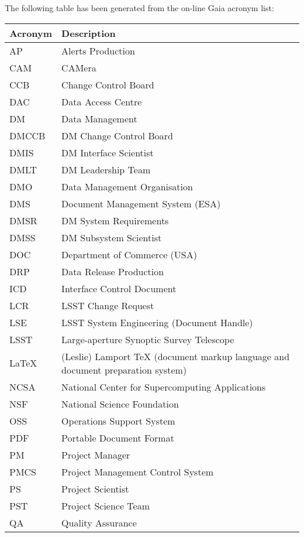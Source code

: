 The following table has been generated from the on-line Gaia acronym list:
\newline\newline%
\addtocounter{table}{-1}
\begin{longtable}{|l|p{}|}\hline 
\textbf{Acronym} & \textbf{Description}  \\\hline
AP&Alerts Production \\\hline
CAM&CAMera \\\hline
CCB&Change Control Board \\\hline
DAC&Data Access Centre \\\hline
DM&Data Management \\\hline
DMCCB&DM Change Control Board \\\hline
DMIS&DM Interface Scientist \\\hline
DMLT&DM Leadership Team \\\hline
DMO&Data Management Organisation \\\hline
DMS&Document Management System (ESA) \\\hline
DMSR&DM System Requirements \\\hline
DMSS&DM Subsystem Scientist \\\hline
DOC&Department of Commerce (USA) \\\hline
DRP&Data Release Production \\\hline
ICD&Interface Control Document \\\hline
LCR&LSST Change Request \\\hline
LSE&LSST System Engineering (Document Handle) \\\hline
LSST&Large-aperture Synoptic Survey Telescope \\\hline
LaTeX&(Leslie) Lamport TeX (document markup language and document preparation system) \\\hline
NCSA&National Center for Supercomputing Applications \\\hline
NSF&National Science Foundation \\\hline
OSS&Operations Support System \\\hline
PDF&Portable Document Format \\\hline
PM&Project Manager \\\hline
PMCS&Project Management Control System \\\hline
PS&Project Scientist \\\hline
PST&Project Science Team \\\hline
QA&Quality Assurance \\\hline

\end{longtable}
